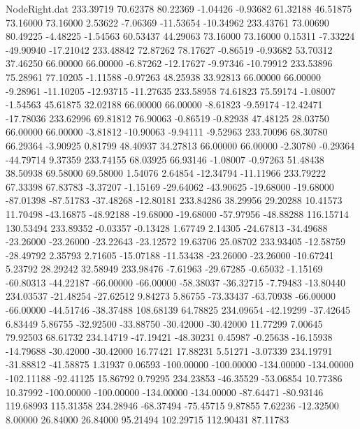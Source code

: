\begin{filecontents}{NodeRight.dat}
 233.39719   70.62378   80.22369    -1.04426   -0.93682   61.32188   46.51875   73.16000   73.16000    2.53622   -7.06369  -11.53654  -10.34962
 233.43761   73.00690   80.49225    -4.48225   -1.54563   60.53437   44.29063   73.16000   73.16000    0.15311   -7.33224  -49.90940  -17.21042
 233.48842   72.87262   78.17627    -0.86519   -0.93682   53.70312   37.46250   66.00000   66.00000   -6.87262  -12.17627   -9.97346  -10.79912
 233.53896   75.28961   77.10205    -1.11588   -0.97263   48.25938   33.92813   66.00000   66.00000   -9.28961  -11.10205  -12.93715  -11.27635
 233.58958   74.61823   75.59174    -1.08007   -1.54563   45.61875   32.02188   66.00000   66.00000   -8.61823   -9.59174  -12.42471  -17.78036
 233.62996   69.81812   76.90063    -0.86519   -0.82938   47.48125   28.03750   66.00000   66.00000   -3.81812  -10.90063   -9.94111   -9.52963
 233.70096   68.30780   66.29364    -3.90925    0.81799   48.40937   34.27813   66.00000   66.00000   -2.30780   -0.29364  -44.79714    9.37359
 233.74155   68.03925   66.93146    -1.08007   -0.97263   51.48438   38.50938   69.58000   69.58000    1.54076    2.64854  -12.34794  -11.11966
 233.79222   67.33398   67.83783    -3.37207   -1.15169  -29.64062  -43.90625  -19.68000  -19.68000  -87.01398  -87.51783  -37.48268  -12.80181
 233.84286   38.29956   29.20288    10.41573   11.70498  -43.16875  -48.92188  -19.68000  -19.68000  -57.97956  -48.88288  116.15714  130.53494
 233.89352   -0.03357   -0.13428     1.67749    2.14305  -24.67813  -34.49688  -23.26000  -23.26000  -23.22643  -23.12572   19.63706   25.08702
 233.93405  -12.58759  -28.49792     2.35793    2.71605  -15.07188  -11.53438  -23.26000  -23.26000  -10.67241    5.23792   28.29242   32.58949
 233.98476   -7.61963  -29.67285    -0.65032   -1.15169  -60.80313  -44.22187  -66.00000  -66.00000  -58.38037  -36.32715   -7.79483  -13.80440
 234.03537  -21.48254  -27.62512     9.84273    5.86755  -73.33437  -63.70938  -66.00000  -66.00000  -44.51746  -38.37488  108.68139   64.78825
 234.09654  -42.19299  -37.42645     6.83449    5.86755  -32.92500  -33.88750  -30.42000  -30.42000   11.77299    7.00645   79.92503   68.61732
 234.14719  -47.19421  -48.30231     0.45987   -0.25638  -16.15938  -14.79688  -30.42000  -30.42000   16.77421   17.88231    5.51271   -3.07339
 234.19791  -31.88812  -41.58875     1.31937    0.06593 -100.00000 -100.00000 -134.00000 -134.00000 -102.11188  -92.41125   15.86792    0.79295
 234.23853  -46.35529  -53.06854    10.77386   10.37992 -100.00000 -100.00000 -134.00000 -134.00000  -87.64471  -80.93146  119.68993  115.31358
 234.28946  -68.37494  -75.45715     9.87855    7.62236  -12.32500    8.00000   26.84000   26.84000   95.21494  102.29715  112.90431   87.11783

\end{filecontents}
